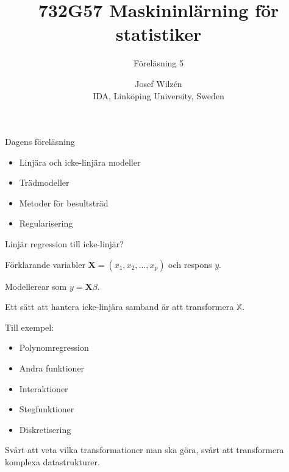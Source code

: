 \documentclass[10pt,english]{beamer}
\title{732G57 Maskininlärning för statistiker}
\subtitle{Föreläsning 5}
\date{}
\author{Josef Wilzén \\ IDA, Linköping University, Sweden}
\begin{document}
\maketitle

\begin{frame}{Dagens föreläsning}
    
    \begin{itemize}
        \item Linjära och icke-linjära modeller
        \item Trädmodeller
        \item Metoder för besultsträd
        \item Regularisering
    \end{itemize}

\end{frame}


\begin{frame}{Linjär regression till icke-linjär?}
    
    Förklarande variabler $\mathbf{X} = (x_1, x_2, \ldots, x_p)$ och respons $y$.

    Modellerear som $y = \mathbf{X}\beta$.

    Ett sätt att hantera icke-linjära samband är att transformera $\mathbb{X}$.

    Till exempel:
    \begin{itemize}
        \item Polynomregression
        \item Andra funktioner
        \item Interaktioner
        \item Stegfunktioner
        \item Diskretisering
    \end{itemize}

    Svårt att veta vilka transformationer man ska göra, svårt att transformera komplexa datastrukturer.

\end{frame}
\end{document}
